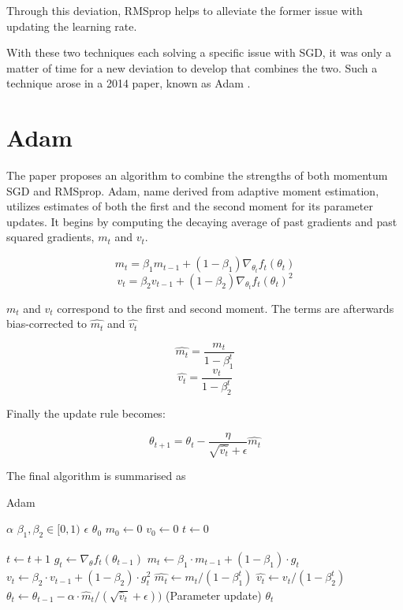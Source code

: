 \documentclass[nohyperref]{article}
\theoremstyle{plain}
\theoremstyle{definition}
\theoremstyle{remark}
\begin{document}
Through this deviation, RMSprop helps to alleviate the former issue with updating the learning rate.

With these two techniques each solving a specific issue with SGD, it was only a matter of time for a new deviation to develop that combines the two. Such a technique arose in a 2014 paper, known as Adam \cite{Kingma14}.\\

\section{Adam}
The paper proposes an algorithm to combine the strengths of both momentum SGD and RMSprop. Adam, name derived from adaptive moment estimation, utilizes estimates of both the first and the second moment for its parameter updates. It begins by computing the decaying average of past gradients and past squared gradients, $m_t$ and $v_t$.

$$m_t = \beta_1m_{t-1}+(1-\beta_1)\nabla_{\theta_t}f_t(\theta_t)$$
$$v_t = \beta_2v_{t-1}+(1-\beta_2)\nabla_{\theta_t}f_t(\theta_t)^{2}$$

$m_t$ and $v_t$ correspond to the first and second moment. The terms are afterwards bias-corrected to $\hat{m_t}$ and $\hat{v_t}$

$$\hat{m_t} = \frac{m_t}{1-\beta_1^t}$$
$$\hat{v_t} = \frac{v_t}{1-\beta_2^t}$$

Finally the update rule becomes:

$$\theta_{t+1} = \theta_t - \frac{\eta}{\sqrt{\hat{v_t}}+\epsilon}\hat{m_t}$$

The final algorithm is summarised as
\begin{algorithm}[!h]
   \caption{Adam}
   \label{main-algo}
\begin{algorithmic}
    $\alpha$ 
    $\beta_{1}, \beta_{2} \in [0,1)$
    $\epsilon$
    $\theta_{0}$
   \STATE $m_{0} \xleftarrow[]{} 0$ 
   \STATE $v_{0} \xleftarrow[]{} 0$ 
   \STATE $t \xleftarrow[]{} 0$ 
   
   \STATE $t \xleftarrow[]{} t+1$
   \STATE $g_{t} \xleftarrow[]{} \nabla_{\theta} f_{t}(\theta_{t-1} )$
   \STATE $m_{t} \xleftarrow[]{} \beta_{1} \cdot m_{t-1} + (1-\beta_{1}) \cdot g_{t}$
   \STATE $v_{t} \xleftarrow[]{} \beta_{2} \cdot v_{t-1} + (1- \beta_{2}) \cdot g^{2}_{t}$
   \STATE $\hat{m_{t}} \xleftarrow[]{}  m_{t}/(1-\beta^{t}_{1}) $ 
   \STATE $\hat{v_{t}} \xleftarrow[]{}  v_{t}/(1-\beta^{t}_{2}) $ 
   \STATE $\theta_{t} \xleftarrow[]{} \theta_{t-1} - \alpha \cdot \hat{m}_{t}/(\sqrt{\hat{v}_{t}} + \epsilon)) $ (Parameter update)
   \ENDWHILE
    $\theta_{t}$
\end{algorithmic}
\end{algorithm}
 
\end{document}
